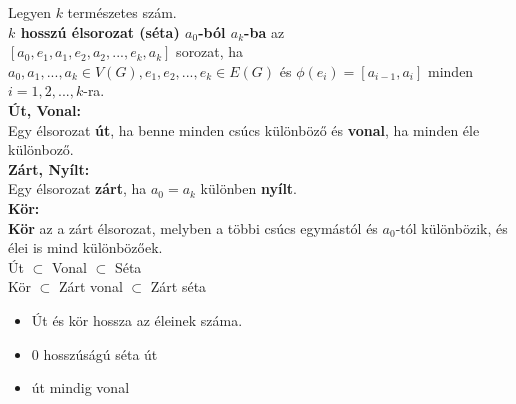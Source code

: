 \begin{frame}
\begin{tcolorbox}[title={Zárt, Nyílt élsorozat (Séta)}]
Legyen $k$ természetes szám.\\
\textbf{$k$ hosszú élsorozat (séta) $a_0$-ból $a_k$-ba} az\\
\msmallskip
$[a_0, e_1, a_1, e_2, a_2, ..., e_k, a_k]$ sorozat, ha $a_0, a_1, ..., a_k \in V(G), e_1, e_2, ..., e_k \in E(G)$ és ${\phi}(e_i) = [a_{i - 1}, a_i]$ minden $i = 1, 2, ..., k$-ra.\\
\mbigskip
\textbf{Út, Vonal:}\\
Egy élsorozat \textbf{út}, ha benne minden csúcs különböző és \textbf{vonal}, ha minden éle különboző.\\
\mbigskip
\textbf{Zárt, Nyílt:}\\
Egy élsorozat \textbf{zárt}, ha $a_0 = a_k$ különben \textbf{nyílt}.\\
\mbigskip
\textbf{Kör:}\\
\textbf{Kör} az a zárt élsorozat, melyben a többi csúcs egymástól és $a_0$-tól különbözik, és élei is mind különbözőek.\\
\mbigskip
Út $\subset$ Vonal $\subset$ Séta\\
\mmedskip
Kör $\subset$ Zárt vonal $\subset$ Zárt séta
\end{tcolorbox}
\begin{tcolorbox}[title={Ész}]
\begin{itemize}
\item Út és kör hossza az éleinek száma.
\item 0 hosszúságú séta út
\item út mindig vonal
\end{itemize}
\end{tcolorbox}

\end{frame}

